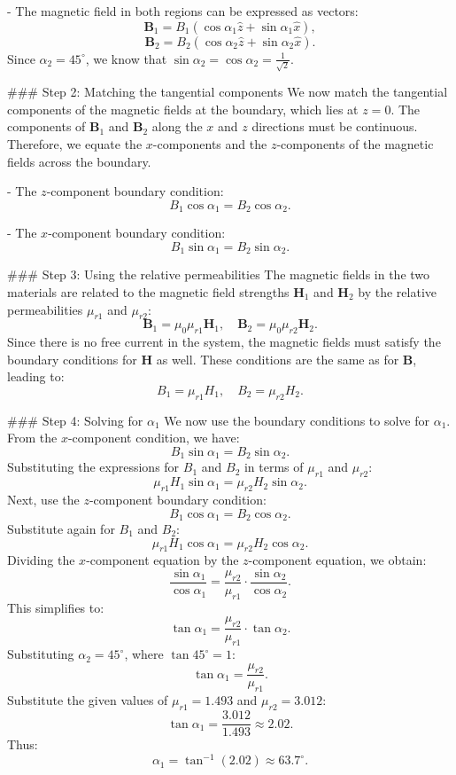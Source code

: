 - The magnetic field in both regions can be expressed as vectors:
  \[
  \mathbf{B}_1 = B_1 (\cos \alpha_1 \hat{z} + \sin \alpha_1 \hat{x}),
  \]
  \[
  \mathbf{B}_2 = B_2 (\cos \alpha_2 \hat{z} + \sin \alpha_2 \hat{x}).
  \]
  Since $\alpha_2 = 45^\circ$, we know that $\sin \alpha_2 = \cos \alpha_2 = \frac{1}{\sqrt{2}}$.

### Step 2: Matching the tangential components
We now match the tangential components of the magnetic fields at the boundary, which lies at $z = 0$. The components of $\mathbf{B}_1$ and $\mathbf{B}_2$ along the $x$ and $z$ directions must be continuous. Therefore, we equate the $x$-components and the $z$-components of the magnetic fields across the boundary.

- The $z$-component boundary condition:
  \[
  B_1 \cos \alpha_1 = B_2 \cos \alpha_2.
  \]

- The $x$-component boundary condition:
  \[
  B_1 \sin \alpha_1 = B_2 \sin \alpha_2.
  \]

### Step 3: Using the relative permeabilities
The magnetic fields in the two materials are related to the magnetic field strengths $\mathbf{H}_1$ and $\mathbf{H}_2$ by the relative permeabilities $\mu_{r1}$ and $\mu_{r2}$:
\[
\mathbf{B}_1 = \mu_0 \mu_{r1} \mathbf{H}_1, \quad \mathbf{B}_2 = \mu_0 \mu_{r2} \mathbf{H}_2.
\]
Since there is no free current in the system, the magnetic fields must satisfy the boundary conditions for $\mathbf{H}$ as well. These conditions are the same as for $\mathbf{B}$, leading to:
\[
B_1 = \mu_{r1} H_1, \quad B_2 = \mu_{r2} H_2.
\]

### Step 4: Solving for $\alpha_1$
We now use the boundary conditions to solve for $\alpha_1$. From the $x$-component condition, we have:
\[
B_1 \sin \alpha_1 = B_2 \sin \alpha_2.
\]
Substituting the expressions for $B_1$ and $B_2$ in terms of $\mu_{r1}$ and $\mu_{r2}$:
\[
\mu_{r1} H_1 \sin \alpha_1 = \mu_{r2} H_2 \sin \alpha_2.
\]
Next, use the $z$-component boundary condition:
\[
B_1 \cos \alpha_1 = B_2 \cos \alpha_2.
\]
Substitute again for $B_1$ and $B_2$:
\[
\mu_{r1} H_1 \cos \alpha_1 = \mu_{r2} H_2 \cos \alpha_2.
\]
Dividing the $x$-component equation by the $z$-component equation, we obtain:
\[
\frac{\sin \alpha_1}{\cos \alpha_1} = \frac{\mu_{r2}}{\mu_{r1}} \cdot \frac{\sin \alpha_2}{\cos \alpha_2}.
\]
This simplifies to:
\[
\tan \alpha_1 = \frac{\mu_{r2}}{\mu_{r1}} \cdot \tan \alpha_2.
\]
Substituting $\alpha_2 = 45^\circ$, where $\tan 45^\circ = 1$:
\[
\tan \alpha_1 = \frac{\mu_{r2}}{\mu_{r1}}.
\]
Substitute the given values of $\mu_{r1} = 1.493$ and $\mu_{r2} = 3.012$:
\[
\tan \alpha_1 = \frac{3.012}{1.493} \approx 2.02.
\]
Thus:
\[
\alpha_1 = \tan^{-1}(2.02) \approx 63.7^\circ.
\]

